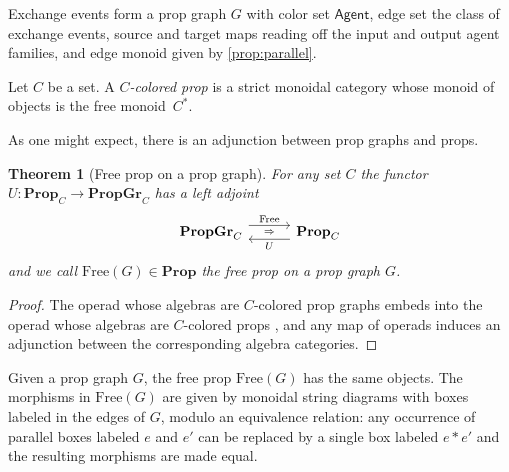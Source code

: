 \documentclass[11pt, one side, article]{memoir}
\newcommand{\adj}[5][30pt]{%
\begin{tikzcd}[ampersand replacement=\&, column sep=#1]
  #2\ar[r, shift left=5pt, "#3"]
  \ar[r, phantom, "\scriptstyle\Rightarrow"]\&
  #5\ar[l, shift left=5pt, "#4"]
\end{tikzcd}
}
\theoremstyle{definition}
\theoremstyle{plain}
\newtheorem{theorem}[theorem]{Theorem}
\newenvironment{example}
  {\pushQED{\qed}\renewcommand{\qedsymbol}{$\lozenge$}\examplex}
  {\popQED\endexamplex}
\newenvironment{definition}
  {\pushQED{\qed}\renewcommand{\qedsymbol}{$\lozenge$}\definitionx}
  {\popQED\enddefinitionx}
\newcommand{\Set}[1]{\mathsf{#1}}%
\newcommand{\Cat}[1]{\mathbf{#1}}%
\newcommand{\prop}{\Cat{Prop}}
\newcommand{\propgr}{\Cat{PropGr}}
\newcommand{\0}{\textsf{0}}
\newcommand{\1}{\tn{\textsf{1}}}
\newcommand{\Free}{\mathrm{Free}}
\begin{document}
\begin{example}\label{ex:prop-graph}
Exchange events form a prop graph $G$ with color set $\Set{Agent}$, edge set the class of exchange events, source and target maps reading off the input and output agent families, and edge monoid given by \cref{prop:parallel}.
\end{example}

\begin{definition}[Prop]\label{def:prop}
Let $C$ be a set.  A \emph{$C$-colored prop} is a strict monoidal category whose monoid of objects is the free monoid~$C^*$.
\end{definition}

As one might expect, there is an adjunction between prop graphs and props.

\begin{theorem}[Free prop on a prop graph]\label{thm:free-prop}
For any set $C$ the functor $U\colon\prop_C\to\propgr_C$ has a left adjoint
\[
\adj{\propgr_C}{\Free}{U}{\prop_C}
\]
and we call $\Free(G)\in\prop$ the \emph{free prop} on a prop graph $G$.
\end{theorem}
\begin{proof}
The operad whose algebras are $C$-colored prop graphs embeds into the operad whose algebras are $C$-colored props \cite{PattersonSpivakVagner}, and any map of operads induces an adjunction between the corresponding algebra categories.
\end{proof}

Given a prop graph $G$, the free prop $\Free(G)$ has the same objects. The morphisms in $\Free(G)$ are given by monoidal string diagrams with boxes labeled in the edges of $G$, modulo an equivalence relation: any occurrence of parallel boxes labeled $e$ and $e'$ can be replaced by a single box labeled $e*e'$ and the resulting morphisms are made equal.
\end{document}
